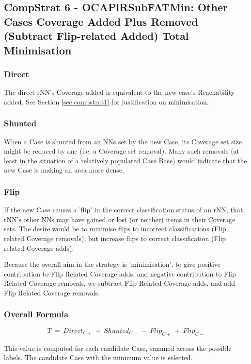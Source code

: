 \documentclass[a4paper,11pt]{report}
\begin{document}
\subsection{CompStrat 6 - OCAPlRSubFATMin: Other Cases Coverage Added Plus Removed (Subtract Flip-related Added) Total Minimisation}

\subsubsection{Direct}

The direct rNN's Coverage added is equivalent to the new case's Reachability added. See Section \ref{sec:compstrat1} for justification on minimisation.

\subsubsection{Shunted}

When a Case is shunted from an NNs set by the new Case, its Coverage set size might be reduced by one (i.e. a Coverage set removal). Many such removals (at least in the situation of a relatively populated Case Base) would indicate that the new Case is making an area more dense.

\subsubsection{Flip}

If the new Case causes a 'flip' in the correct classification status of an rNN, that rNN's other NNs may have gained or lost (or neither) items in their Coverage sets. The desire would be to minimise flips to incorrect classifications (Flip related Coverage removals), but increase flips to correct classification (Flip related Coverage adds).

Because the overall aim in the strategy is 'minimisation', to give positive contribution to Flip Related Coverage adds, and negative contribution to Flip Related Coverage removals, we subtract Flip Related Coverage adds, and add Flip Related Coverage removals.

\subsubsection{Overall Formula}
\[  
  T~=~Direct_{C+}~+~Shunted_{C-}~-~Flip_{C+}~+~Flip_{C-}
\]

This value is computed for each candidate Case, summed across the possible labels. The candidate Case with the minimum value is selected.
\end{document}
